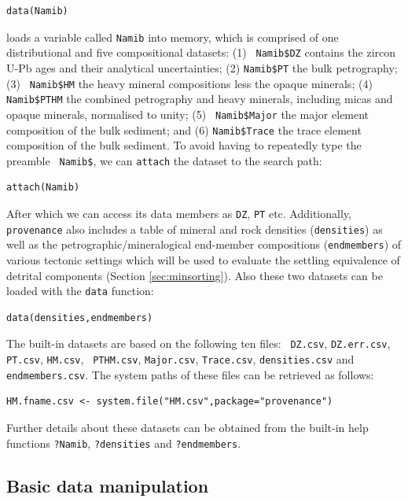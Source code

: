 \documentclass{article}
\begin{document}
\begin{verbatim}
data(Namib)
\end{verbatim}

loads a variable called {\tt Namib} into memory, which is comprised of
one distributional and five compositional datasets: (1) {\tt
  Namib\$DZ} contains the zircon U-Pb ages and their analytical
uncertainties; (2) {\tt Namib\$PT} the bulk petrography; (3) {\tt
  Namib\$HM} the heavy mineral compositions less the opaque minerals;
(4) {\tt Namib\$PTHM} the combined petrography and heavy minerals,
including micas and opaque minerals, normalised to unity; (5) {\tt
  Namib\$Major} the major element composition of the bulk sediment;
and (6) {\tt Namib\$Trace} the trace element composition of the bulk
sediment. To avoid having to repeatedly type the preamble {\tt
  Namib\$}, we can {\tt attach} the dataset to the search path:

\begin{verbatim}
attach(Namib)
\end{verbatim}

After which we can access its data members as {\tt DZ}, {\tt PT}
etc.  Additionally, {\tt provenance} also includes a table of mineral
and rock densities ({\tt densities}) as well as the
petrographic/mineralogical end-member compositions ({\tt endmembers})
of various tectonic settings which will be used to evaluate the
settling equivalence of detrital components (Section
\ref{sec:minsorting}). Also these two datasets can be loaded with the
{\tt data} function:

\begin{verbatim}
data(densities,endmembers)
\end{verbatim}

The built-in datasets are based on the following ten files: {\tt
  DZ.csv}, {\tt DZ.err.csv}, {\tt PT.csv}, {\tt HM.csv}, {\tt
  PTHM.csv}, {\tt Major.csv}, {\tt Trace.csv}, {\tt densities.csv} and
{\tt endmembers.csv}. The system paths of these files can be retrieved
as follows:

\begin{verbatim}
HM.fname.csv <- system.file("HM.csv",package="provenance")
\end{verbatim}

Further details about these datasets can be obtained from the built-in
help functions {\tt ?Namib}, {\tt ?densities} and
{\tt ?endmembers}.

\subsection{Basic data manipulation}
\label{sec:datamanipulation}
\end{document}
